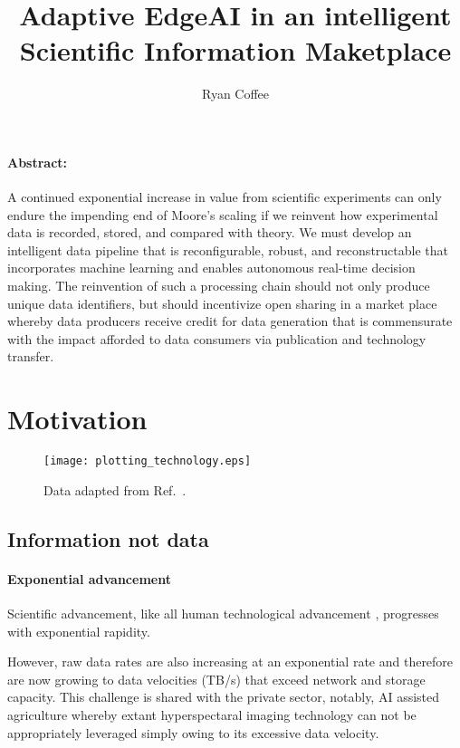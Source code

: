 \documentclass{article}
\title{Adaptive EdgeAI in an intelligent Scientific Information Maketplace}
\author{Ryan Coffee}
\begin{document}
\maketitle

\paragraph{Abstract:} %
A continued exponential increase in value from scientific experiments can only endure the impending end of Moore's scaling if we reinvent how experimental data is recorded, stored, and compared with theory.
We must develop an intelligent data pipeline that is reconfigurable, robust, and reconstructable that incorporates machine learning and enables autonomous real-time decision making.
The reinvention of such a processing chain should not only produce unique data identifiers, but should incentivize open sharing in a market place whereby data producers receive credit for data generation that is commensurate with the impact afforded to data consumers via publication and technology transfer.

\section{Motivation}
\begin{wrapfigure}[33]{r}{.5\linewidth}
	\centerline{ \texttt{[image: plotting\_technology.eps]} }
	\caption{
		\label{fig::technology} 
		Data adapted from Ref.~\cite{MicroprocessorTrendData}. 
	}
\end{wrapfigure}

\subsection{Information not data}
\paragraph{Exponential advancement}
Scientific advancement, like all human technological advancement \cite{Kurzweil}, progresses with exponential rapidity.

However, raw data rates are also increasing at an exponential rate and therefore are now growing to data velocities (TB/s) that exceed network and storage capacity.  
This challenge is shared with the private sector, notably, AI assisted agriculture whereby extant hyperspectaral imaging technology can not be appropriately leveraged simply owing to its excessive data velocity.
\end{document}
